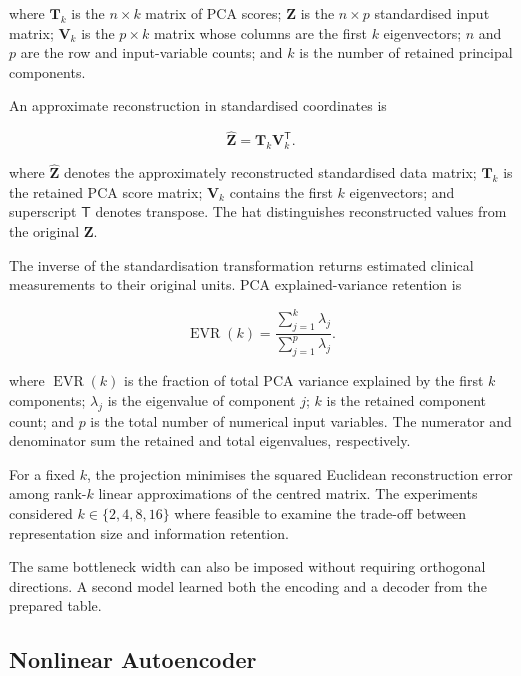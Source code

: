 \noindent where \(\boldsymbol{T}_k\) is the \(n\times k\) matrix of PCA scores;
\(\boldsymbol{Z}\) is the \(n\times p\) standardised input matrix;
\(\boldsymbol{V}_k\) is the \(p\times k\) matrix whose columns are the
first \(k\) eigenvectors; \(n\) and \(p\) are the row and input-variable
counts; and \(k\) is the number of retained principal components.

\noindent An approximate reconstruction in standardised coordinates is

\[
\widehat{\boldsymbol{Z}}=\boldsymbol{T}_k\boldsymbol{V}_k^{\mathsf T}.\tag{3.7.5}
\]

\noindent where \(\widehat{\boldsymbol{Z}}\) denotes the approximately
reconstructed standardised data matrix; \(\boldsymbol{T}_k\) is the
retained PCA score matrix; \(\boldsymbol{V}_k\) contains the first \(k\)
eigenvectors; and superscript \(\mathsf{T}\) denotes transpose. The hat
distinguishes reconstructed values from the original \(\boldsymbol{Z}\).

\noindent The inverse of the standardisation transformation returns estimated
clinical measurements to their original units. PCA explained-variance
retention is

\[
\operatorname{EVR}(k)=
\frac{\sum_{j=1}^{k}\lambda_j}{\sum_{j=1}^{p}\lambda_j}.\tag{3.7.6}
\]

\noindent where \(\operatorname{EVR}(k)\) is the fraction of total PCA variance
explained by the first \(k\) components; \(\lambda_j\) is the eigenvalue
of component \(j\); \(k\) is the retained component count; and \(p\) is
the total number of numerical input variables. The numerator and
denominator sum the retained and total eigenvalues, respectively.

\noindent For a fixed \(k\), the projection minimises the squared Euclidean
reconstruction error among rank-\(k\) linear approximations of the
centred matrix. The experiments considered \(k\in\{2,4,8,16\}\) where feasible to examine
the trade-off between representation size and information retention.

\noindent The same bottleneck width can also be imposed without requiring orthogonal directions. A second model learned both the encoding and a decoder from the prepared table.

\subsection{Nonlinear Autoencoder}\label{nonlinear-autoencoder}

